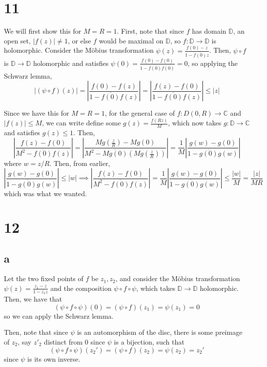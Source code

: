 \documentclass[12pt,letterpaper]{article}
\theoremstyle{definition}
\newcommand{\D}{\mathbb{D}}
\newcommand{\C}{\mathbb{C}}
\begin{document}
\section*{11}

We will first show this for $M = R = 1$. First, note that since $f$ has domain $\D$, an open set, $|f(z)| \neq 1$, or else $f$ would be maximal on $\D$, so $f: \D \rightarrow \D$ is holomorphic. Consider the M\"obius transformation $\psi(z) = \frac{f(0) - z}{1 - \overline{f(0)}z}$. Then, $\psi \circ f$ is $\D \rightarrow \D$ holomorphic and satisfies $\psi(0) = \frac{f(0) - f(0)}{1 - \overline{f(0)}f(0)} = 0$, so applying the Schwarz lemma,
\[
  |(\psi \circ f)(z)| = \left|\frac{f(0) - f(z)}{1 - \overline{f(0)}f(z)}\right| = \left|\frac{f(z) - f(0)}{1 - \overline{f(0)}f(z)}\right| \leq |z|
\]

Since we have this for $M = R = 1$, for the general case of $f: D(0, R) \rightarrow \C$ and $|f(z)| \leq M$, we can write define some $g(z) = \frac{f(Rz)}{M}$, which now takes $g: \D \rightarrow \C$ and satisfies $g(z) \leq 1$. Then,
\[
  \left|\frac{f(z) - f(0)}{M^{2} - \overline{f(0)}f(z)}\right| = \left|\frac{Mg\left(\frac{z}{R}\right) - Mg(0)}{M^{2} - \overline{Mg(0)}\left(Mg\left(\frac{z}{R}\right)\right)}\right| = \frac{1}{M}\left|\frac{g(w) - g(0)}{1 - \overline{g(0)}{g(w)}}\right|
\]
where $w = z/R$. Then, from earlier,
\[
  \left|\frac{g(w) - g(0)}{1 - \overline{g(0)}{g(w)}}\right| \leq |w| \implies \left|\frac{f(z) - f(0)}{M^{2} - \overline{f(0)}f(z)}\right| = \frac{1}{M}\left|\frac{g(w) - g(0)}{1 - \overline{g(0)}{g(w)}}\right| \leq \frac{|w|}{M} = \frac{|z|}{MR}
\]
which was what we wanted.

\section*{12}

\subsection*{a}

Let the two fixed points of $f$ be $z_{1}, z_{2}$, and consider the M\"obius transformation $\psi(z) = \frac{z_{1} - z}{1 - \overline{z_{1}}z}$ and the composition $\psi \circ f \circ \psi$, which takes $\D \rightarrow \D$ holomorphic. Then, we have that
\[
  (\psi \circ f \circ \psi)(0) = (\psi \circ f)(z_{1}) = \psi(z_{1}) = 0
\]
so we can apply the Schwarz lemma.

Then, note that since $\psi$ is an automorphism of the disc, there is some preimage of $z_{2}$, say $z'_{2}$ distinct from 0 since $\psi$ is a bijection, such that
\[
  (\psi \circ f \circ \psi)(z_{2}') = (\psi \circ f)(z_{2}) = \psi(z_{2}) = z_{2}'
\]
since $\psi$ is its own inverse.
\end{document}
